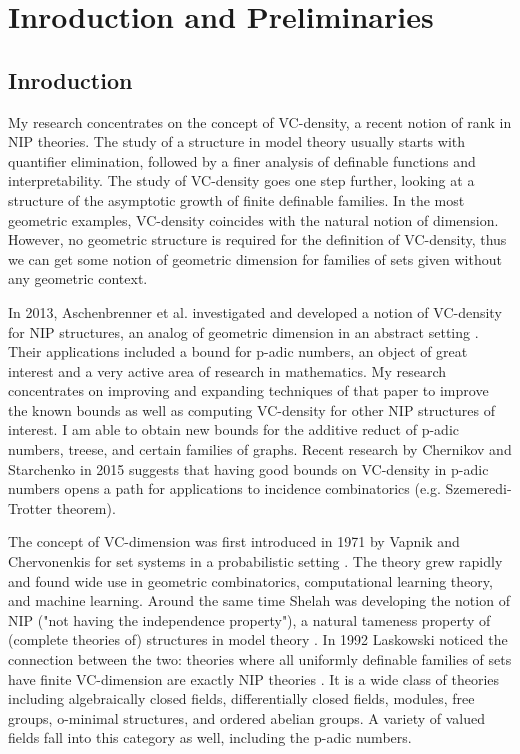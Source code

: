 \chapter{Inroduction and Preliminaries}

\section{Inroduction}

My research concentrates on the concept of VC-density, a recent notion of rank in NIP theories.
The study of a structure in model theory usually starts with quantifier elimination, followed by a finer analysis of definable functions and interpretability.
The study of VC-density goes one step further, looking at a structure of the asymptotic growth of finite definable families.
In the most geometric examples, VC-density coincides with the natural notion of dimension.
However, no geometric structure is required for the definition of VC-density, thus we can get some notion of geometric dimension for families of sets given without any geometric context.

In 2013, Aschenbrenner et al. investigated and developed a notion of VC-density for NIP structures, an analog of geometric dimension in an abstract setting \cite{density}. Their applications included a bound for p-adic numbers, an object of great interest and a very active area of research in mathematics. My research concentrates on improving and expanding techniques of that paper to improve the known bounds as well as computing VC-density for other NIP structures of interest. I am able to obtain new bounds for the additive reduct of p-adic numbers, treese, and certain families of graphs. Recent research by Chernikov and Starchenko in 2015 \cite{regularity} suggests that having good bounds on VC-density in p-adic numbers opens a path for applications to incidence combinatorics (e.g. Szemeredi-Trotter theorem).

The concept of VC-dimension was first introduced in 1971 by Vapnik and Chervonenkis for set systems in a probabilistic setting \cite{vc71}.
The theory grew rapidly and found wide use in geometric combinatorics, computational learning theory, and machine learning.
Around the same time Shelah was developing the notion of NIP ("not having the independence property"),
a natural tameness property of (complete theories of) structures in model theory \cite{shelah_nip}.
In 1992 Laskowski noticed the connection between the two: theories where all uniformly definable families of sets have finite VC-dimension are exactly NIP theories \cite{laskowski92}.
It is a wide class of theories including algebraically closed fields, differentially closed fields, modules, free groups, o-minimal structures, and ordered abelian groups.
A variety of valued fields fall into this category as well, including the p-adic numbers.

